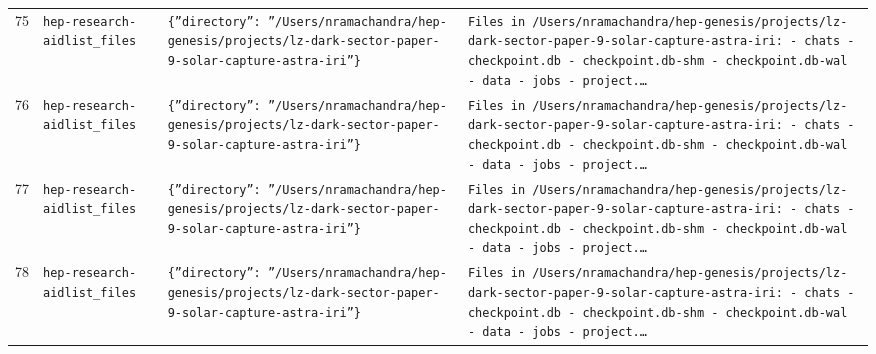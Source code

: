 \documentclass[11pt,a4paper]{article}
\begin{document}
\begin{longtable}{@{}p{}p{}p{}p{}@{}}
75 & \texttt{hep-research-aid}\newline\texttt{list\_\allowbreak{}files} & \texttt{\{''directory'':\allowbreak{} ''/\allowbreak{}Users/\allowbreak{}nramachandra/\allowbreak{}hep-genesis/\allowbreak{}projects/\allowbreak{}lz-dark-sector-paper-9-solar-capture-astra-iri''\}\allowbreak{}} & \texttt{Files in /\allowbreak{}Users/\allowbreak{}nramachandra/\allowbreak{}hep-genesis/\allowbreak{}projects/\allowbreak{}lz-dark-sector-paper-9-solar-capture-astra-iri:\allowbreak{}   - chats   - checkpoint.db   - checkpoint.db-shm   - checkpoint.db-wal   - data   - jobs   - project.\ldots{}\allowbreak{}} \\
76 & \texttt{hep-research-aid}\newline\texttt{list\_\allowbreak{}files} & \texttt{\{''directory'':\allowbreak{} ''/\allowbreak{}Users/\allowbreak{}nramachandra/\allowbreak{}hep-genesis/\allowbreak{}projects/\allowbreak{}lz-dark-sector-paper-9-solar-capture-astra-iri''\}\allowbreak{}} & \texttt{Files in /\allowbreak{}Users/\allowbreak{}nramachandra/\allowbreak{}hep-genesis/\allowbreak{}projects/\allowbreak{}lz-dark-sector-paper-9-solar-capture-astra-iri:\allowbreak{}   - chats   - checkpoint.db   - checkpoint.db-shm   - checkpoint.db-wal   - data   - jobs   - project.\ldots{}\allowbreak{}} \\
77 & \texttt{hep-research-aid}\newline\texttt{list\_\allowbreak{}files} & \texttt{\{''directory'':\allowbreak{} ''/\allowbreak{}Users/\allowbreak{}nramachandra/\allowbreak{}hep-genesis/\allowbreak{}projects/\allowbreak{}lz-dark-sector-paper-9-solar-capture-astra-iri''\}\allowbreak{}} & \texttt{Files in /\allowbreak{}Users/\allowbreak{}nramachandra/\allowbreak{}hep-genesis/\allowbreak{}projects/\allowbreak{}lz-dark-sector-paper-9-solar-capture-astra-iri:\allowbreak{}   - chats   - checkpoint.db   - checkpoint.db-shm   - checkpoint.db-wal   - data   - jobs   - project.\ldots{}\allowbreak{}} \\
78 & \texttt{hep-research-aid}\newline\texttt{list\_\allowbreak{}files} & \texttt{\{''directory'':\allowbreak{} ''/\allowbreak{}Users/\allowbreak{}nramachandra/\allowbreak{}hep-genesis/\allowbreak{}projects/\allowbreak{}lz-dark-sector-paper-9-solar-capture-astra-iri''\}\allowbreak{}} & \texttt{Files in /\allowbreak{}Users/\allowbreak{}nramachandra/\allowbreak{}hep-genesis/\allowbreak{}projects/\allowbreak{}lz-dark-sector-paper-9-solar-capture-astra-iri:\allowbreak{}   - chats   - checkpoint.db   - checkpoint.db-shm   - checkpoint.db-wal   - data   - jobs   - project.\ldots{}\allowbreak{}} \\

\end{longtable}
\end{document}
